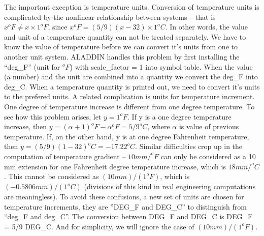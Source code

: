 \vspace{0.15 in}
\noindent\hspace{0.5 in}
The important exception is temperature units.
Conversion of temperature units is complicated by the
nonlinear relationship between systems -- that is
$x^o F \neq x \times 1^o F$, since $ x^o F = (5/9)(x -32) \times 1^o C $.
In other words, the value and unit of a temperature quantity can not be treated separately.
We have to know the value of temperature before we can convert it's units from
one to another unit system. ALADDIN handles this problem by first installing
the ``deg\_F'' (unit for $ ^o F $) with scale\_factor = 1 into symbol table.
When the value (a number) and the unit are combined into a quantity
we convert the deg\_F into deg\_C. When a temperature quantity is printed out,
we need to convert it's units to the prefered units.
A related complication is units for temperature increment.
One degree of temperature increase is different from one degree temperature.
To see how this problem arises, let $y = 1^o F$.
If y is a one degree temperature increase,
then $ y = (\alpha + 1)^oF - \alpha^oF = 5/9 ^oC$,
where $\alpha $ is value of previous temperature.
If, on the other hand, y is at one degree Fahrenheit temperature,
then $ y = (5/9)(1-32) ^oC = -17.22 ^o C$.
Similar difficulties crop up in the computation of temperature gradient --
$ 10 mm/^oF $ can only be considered as a 10 mm extension
for one Fahrenheit degree temperature increase, which is $ 18 mm/^oC $.
This cannot be considered as $ (10 mm) / (1^oF)$, which is $ (-0.5806 mm) / (1^oC)$
(divisions of this kind in real engineering computations are meaningless).
To avoid these confusions, a new set of units are chosen
for temperature increments, they are ''DEG\_F and DEG\_C'' to distinguish from ``deg\_F and deg\_C''.
The conversion between DEG\_F and DEG\_C is DEG\_F = 5/9 DEG\_C.
And for simplicity, we will ignore the case of $ (10 mm) / (1^oF) $.

